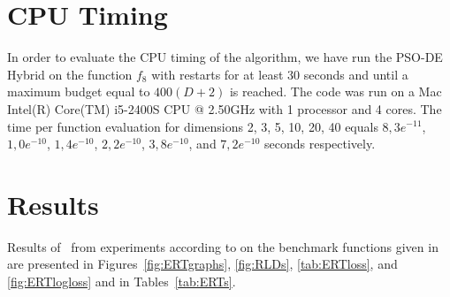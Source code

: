 \documentclass{sig-alternate}
\newcommand{\change}[1]{{\color{red} #1}}
\begin{document}
{\section{CPU Timing}
In order to evaluate the CPU timing of the algorithm, we have run the \change{PSO-DE Hybrid} on the function $f_{8}$ with restarts for at least 30 seconds and until a maximum budget equal to \change{$400 (D + 2)$} is reached. The code was run on a \change{Mac Intel(R) Core(TM) i5-2400S CPU @ 2.50GHz} with \change{1} processor and \change{4} cores. The time per function evaluation for dimensions 2, 3, 5, 10, 20, 40 equals $8,3e^{-11}$, $1,0e^{-10}$, $1,4e^{-10}$, $2,2e^{-10}$, $3,8e^{-10}$, and $7,2e^{-10}$ seconds respectively. 


\section{Results}

Results of \algname\ from experiments according to \cite{hansen2012exp} on the benchmark
functions given in \cite{wp200901_2010,hansen2012fun} are presented in
Figures~\ref{fig:ERTgraphs}, \ref{fig:RLDs}, \ref{tab:ERTloss}, and \ref{fig:ERTlogloss} and in
Tables~\ref{tab:ERTs}.




}
\end{document}
